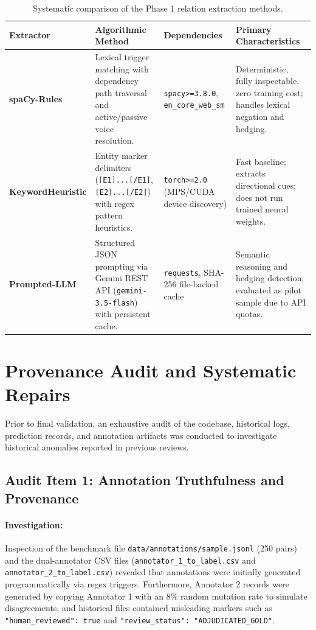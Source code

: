 \documentclass[11pt,a4paper]{article}
\begin{document}
\begin{table}[htbp]
\centering
\small
\caption{Systematic comparison of the Phase 1 relation extraction methods.}
\label{tab:extractor_comparison}
\begin{tabularx}{\textwidth}{l p{4.2cm} p{3.5cm} X}
\toprule
\textbf{Extractor} & \textbf{Algorithmic Method} & \textbf{Dependencies} & \textbf{Primary Characteristics} \\
\midrule
\textbf{spaCy-Rules} & Lexical trigger matching with dependency path traversal and active/passive voice resolution. & \texttt{spacy>=3.8.0}, \texttt{en\_core\_web\_sm} & Deterministic, fully inspectable, zero training cost; handles lexical negation and hedging. \\
\addlinespace
\textbf{KeywordHeuristic} & Entity marker delimiters (\texttt{[E1]...[/E1]}, \texttt{[E2]...[/E2]}) with regex pattern heuristics. & \texttt{torch>=2.0} (MPS/CUDA device discovery) & Fast baseline; extracts directional cues; does not run trained neural weights. \\
\addlinespace
\textbf{Prompted-LLM} & Structured JSON prompting via Gemini REST API (\texttt{gemini-3.5-flash}) with persistent cache. & \texttt{requests}, SHA-256 file-backed cache & Semantic reasoning and hedging detection; evaluated as pilot sample due to API quotas. \\
\bottomrule
\end{tabularx}
\end{table}

\section{Provenance Audit and Systematic Repairs}
\label{sec:provenance_audit}

Prior to final validation, an exhaustive audit of the codebase, historical logs, prediction records, and annotation artifacts was conducted to investigate historical anomalies reported in previous reviews.

\subsection{Audit Item 1: Annotation Truthfulness and Provenance}
\paragraph{Investigation:} Inspection of the benchmark file \texttt{data/annotations/sample.jsonl} (250 pairs) and the dual-annotator CSV files (\texttt{annotator\_1\_to\_label.csv} and \texttt{annotator\_2\_to\_label.csv}) revealed that annotations were initially generated programmatically via regex triggers. Furthermore, Annotator 2 records were generated by copying Annotator 1 with an 8\% random mutation rate to simulate disagreements, and historical files contained misleading markers such as \texttt{"human\_reviewed": true} and \texttt{"review\_status": "ADJUDICATED\_GOLD"}.
\end{document}
